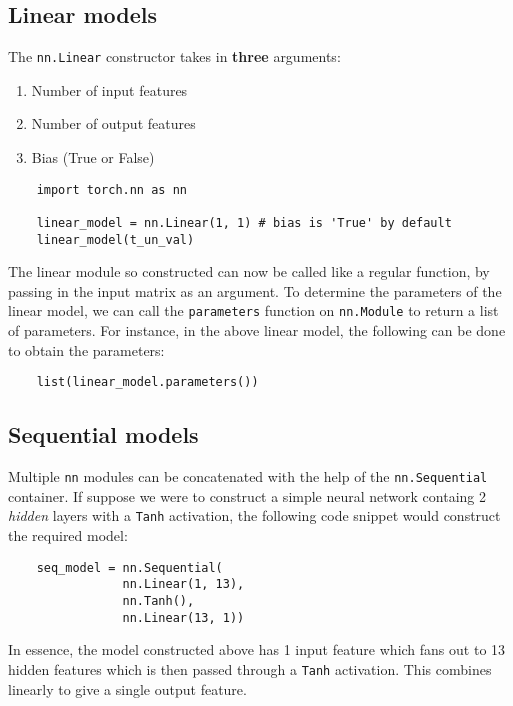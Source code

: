 \documentclass[11pt]{article}
\begin{document}
\subsection{Linear models}
\label{sec:orgc7bf91b}
The \texttt{nn.Linear} constructor takes in \textbf{three} arguments:
\begin{enumerate}
\item Number of input features
\item Number of output features
\item Bias (True or False)
\end{enumerate}
\begin{verbatim}
    import torch.nn as nn

    linear_model = nn.Linear(1, 1) # bias is 'True' by default
    linear_model(t_un_val)
\end{verbatim}
The linear module so constructed can now be called like a regular function, by passing in the input matrix as an argument. To determine the parameters of the linear model, we can call the \texttt{parameters} function on \texttt{nn.Module} to return a list of parameters. For instance, in the above linear model, the following can be done to obtain the parameters:
\begin{verbatim}
    list(linear_model.parameters())
\end{verbatim}

\subsection{Sequential models}
\label{sec:org0753f74}
Multiple \texttt{nn} modules can be concatenated with the help of the \texttt{nn.Sequential} container. If suppose we were to construct a simple neural network containg 2 \emph{hidden} layers with a \texttt{Tanh} activation, the following code snippet would construct the required model:
\begin{verbatim}
    seq_model = nn.Sequential(
                nn.Linear(1, 13),
                nn.Tanh(),
                nn.Linear(13, 1))
\end{verbatim}
In essence, the model constructed above has 1 input feature which fans out to 13 hidden features which is then passed through a \texttt{Tanh} activation. This combines linearly to give a single output feature.
\end{document}
